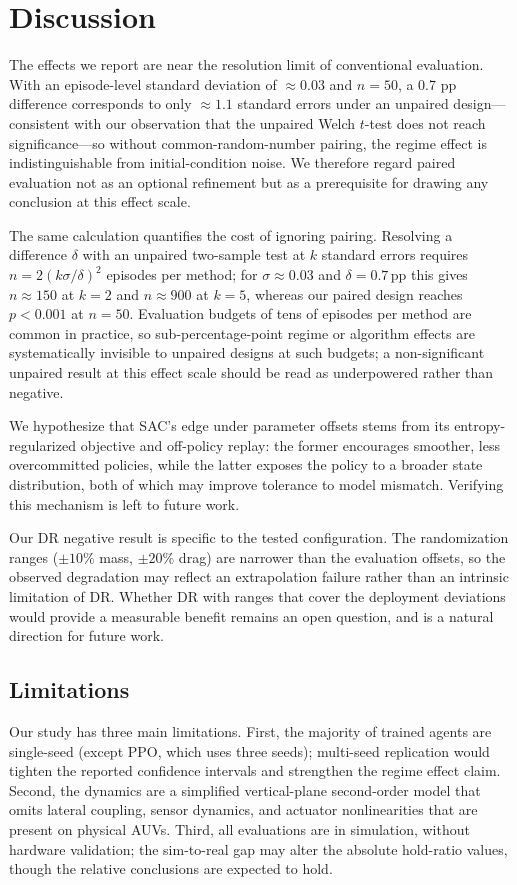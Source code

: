 \documentclass[conference]{IEEEtran}
\begin{document}
\section{Discussion}
The effects we report are near the resolution limit of conventional evaluation. With an episode-level standard deviation of $\approx 0.03$ and $n=50$, a 0.7 pp difference corresponds to only $\approx 1.1$ standard errors under an unpaired design---consistent with our observation that the unpaired Welch $t$-test does not reach significance---so without common-random-number pairing, the regime effect is indistinguishable from initial-condition noise. We therefore regard paired evaluation not as an optional refinement but as a prerequisite for drawing any conclusion at this effect scale.

The same calculation quantifies the cost of ignoring pairing. Resolving a difference $\delta$ with an unpaired two-sample test at $k$ standard errors requires $n = 2(k\sigma/\delta)^2$ episodes per method; for $\sigma \approx 0.03$ and $\delta = 0.7$\,pp this gives $n \approx 150$ at $k{=}2$ and $n \approx 900$ at $k{=}5$, whereas our paired design reaches $p<0.001$ at $n=50$. Evaluation budgets of tens of episodes per method are common in practice, so sub-percentage-point regime or algorithm effects are systematically invisible to unpaired designs at such budgets; a non-significant unpaired result at this effect scale should be read as underpowered rather than negative.

We hypothesize that SAC's edge under parameter offsets stems from its entropy-regularized objective and off-policy replay: the former encourages smoother, less overcommitted policies, while the latter exposes the policy to a broader state distribution, both of which may improve tolerance to model mismatch. Verifying this mechanism is left to future work.

Our DR negative result is specific to the tested configuration. The randomization ranges ($\pm 10\%$ mass, $\pm 20\%$ drag) are narrower than the evaluation offsets, so the observed degradation may reflect an extrapolation failure rather than an intrinsic limitation of DR. Whether DR with ranges that cover the deployment deviations would provide a measurable benefit remains an open question, and is a natural direction for future work.

\subsection{Limitations}
Our study has three main limitations. First, the majority of trained agents are single-seed (except PPO, which uses three seeds); multi-seed replication would tighten the reported confidence intervals and strengthen the regime effect claim. Second, the dynamics are a simplified vertical-plane second-order model that omits lateral coupling, sensor dynamics, and actuator nonlinearities that are present on physical AUVs. Third, all evaluations are in simulation, without hardware validation; the sim-to-real gap may alter the absolute hold-ratio values, though the relative conclusions are expected to hold.
\end{document}
